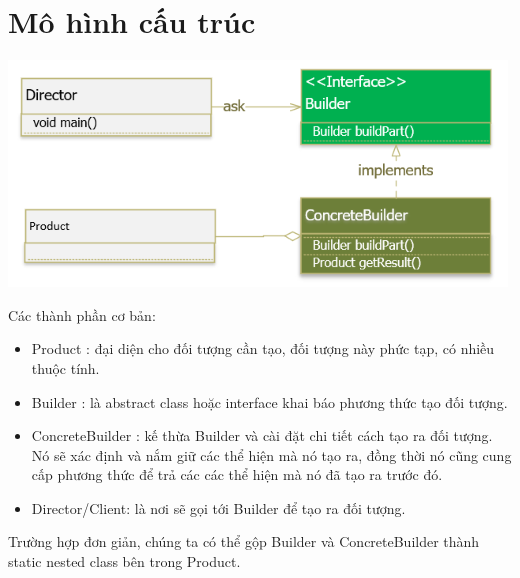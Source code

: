 \section{Mô hình cấu trúc}
\begin{center}
\includegraphics{GALLEYS/images/chapter10/diagram}
\end{center}
Các thành phần cơ bản:\\
\begin{itemize}
\item Product : đại diện cho đối tượng cần tạo, đối tượng này phức tạp, có nhiều thuộc tính.
\item Builder : là abstract class hoặc interface khai báo phương thức tạo đối tượng.
\item ConcreteBuilder : kế thừa Builder và cài đặt chi tiết cách tạo ra đối tượng. Nó sẽ xác định và nắm giữ các thể hiện mà nó tạo ra, đồng thời nó cũng cung cấp phương thức để trả các các thể hiện mà nó đã tạo ra trước đó.
\item Director/Client: là nơi sẽ gọi tới Builder để tạo ra đối tượng.
\end{itemize}
Trường hợp đơn giản, chúng ta có thể gộp Builder và ConcreteBuilder thành static nested class bên trong Product.\\

